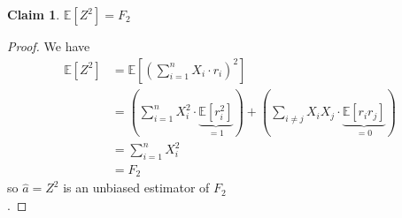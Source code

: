 \documentclass[11pt]{article}
\newtheorem{claim}{Claim}
\newcommand{\Expect}{\mathbb{E}}
\begin{document}
\begin{claim} \label{claim2}
	$\Expect[Z^2] = F_2$
\end{claim}
\begin{proof}
We have
\begin{align*}
\Expect[Z^2] &= \Expect \left[ \left(\sum_{i=1}^{n} X_i \cdot r_i\right)^2\right] \\[4pt]
&= \left(\sum_{i=1}^{n} X_i^2 \cdot \underbrace{\Expect[r_i^2]}_{=1}\right) + \left(\sum_{i \neq j} X_i X_j \cdot \underbrace{\Expect[r_ir_j]}_{=0}\right) \\[4pt]
&= \sum_{i=1}^{n} X_i^2 \\[3pt]
&= F_2
\end{align*}
\noindent so $\hat{a} = Z^2$ is an unbiased estimator of $F_2$\\.
\end{proof}
\end{document}
